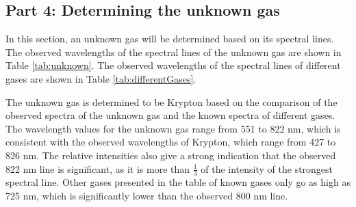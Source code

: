\subsection{Part 4: Determining the unknown gas}

In this section, an unknown gas will be determined based on its spectral lines.
The observed wavelengths of the spectral lines of the unknown gas are shown in Table \ref{tab:unknown}.
The observed wavelengths of the spectral lines of different gases are shown in Table \ref{tab:differentGases}.

The unknown gas is determined to be Krypton based on the comparison of the observed spectra of the unknown gas and the known spectra of different gases.
The wavelength values for the unknown gas range from 551 to 822 nm, which is consistent with the observed wavelengths of Krypton, which range from 427 to 826 nm.
The relative intensities also give a strong indication that the observed 822 nm line is significant, as it is more than $\frac{1}{3}$ of the intensity of the
strongest spectral line.
Other gases presented in the table of known gases only go as high as 725 nm, which is significantly lower than the observed 800 nm line.


